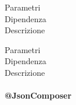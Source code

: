 \begin{description}
\begin{mldescription}
    \begin{description}
	 \item[Parametri]
	 \item[Dipendenza]
	 \item[Descrizione]
	\end{description}	    
    
    \begin{description}
	 \item[Parametri]
	 \item[Dipendenza]
	 \item[Descrizione]
	\end{description}	    
    
  \end{mldescription}
\end{description}

\paragraph{@JsonComposer}

